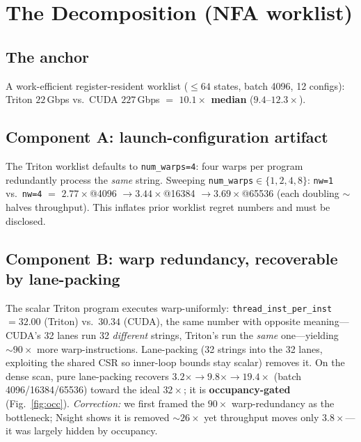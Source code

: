 \documentclass[conference]{IEEEtran}
\begin{document}
\section{The Decomposition (NFA worklist)}\label{sec:decomp}

\subsection{The anchor}
A work-efficient register-resident worklist ($\le 64$ states, batch 4096, 12 configs): Triton
$22$\,Gbps vs.\ CUDA $227$\,Gbps $=$ \textbf{$10.1\times$ median} ($9.4$--$12.3\times$).

\subsection{Component A: launch-configuration artifact}\label{sec:artifact}
The Triton worklist defaults to \texttt{num\_warps=4}: four warps per program redundantly process the
\emph{same} string. Sweeping \texttt{num\_warps}$\in\{1,2,4,8\}$: \texttt{nw=1} vs.\ \texttt{nw=4} $=$
$2.77\times$@4096 $\rightarrow 3.44\times$@16384 $\rightarrow 3.69\times$@65536 (each doubling
${\sim}$halves throughput). This inflates prior worklist regret numbers and must be disclosed.

\subsection{Component B: warp redundancy, recoverable by lane-packing}
The scalar Triton program executes warp-uniformly: \texttt{thread\_inst\_per\_inst} $=32.00$ (Triton)
vs.\ $30.34$ (CUDA), the same number with opposite meaning---CUDA's 32 lanes run 32 \emph{different}
strings, Triton's run the \emph{same} one---yielding ${\sim}90\times$ more warp-instructions. Lane-packing
(32 strings into the 32 lanes, exploiting the shared CSR so inner-loop bounds stay scalar) removes it.
On the dense scan, pure lane-packing recovers $3.2\times \rightarrow 9.8\times \rightarrow 19.4\times$
(batch 4096/16384/65536) toward the ideal $32\times$; it is \textbf{occupancy-gated}
(Fig.~\ref{fig:occ}). \emph{Correction:} we first framed the $90\times$ warp-redundancy as the
bottleneck; Nsight shows it is removed ${\sim}26\times$ yet throughput moves only $3.8\times$---it was
largely hidden by occupancy.
\end{document}
